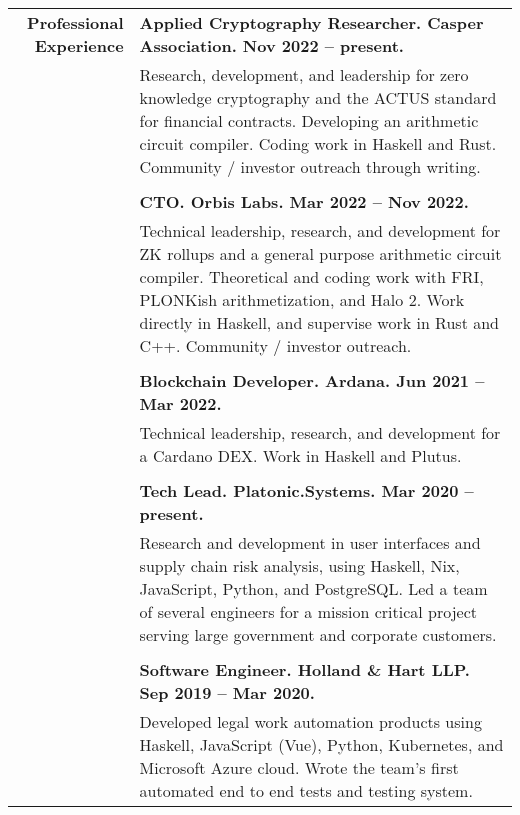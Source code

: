 \documentclass{article}
\begin{document}
\begin{tabular}{rl}
  {\bf Professional Experience} 
  & {\bf Applied Cryptography Researcher. Casper Association. Nov 2022 -- present.} \\
  & \parbox{4.5in}{Research, development, and leadership for zero knowledge cryptography
	and the ACTUS standard for financial contracts. Developing an arithmetic circuit compiler.
	Coding work in Haskell and Rust. Community / investor outreach through writing.} \\ \\
  & {\bf CTO. Orbis Labs. Mar 2022 -- Nov 2022.} \\
  & \parbox{4.5in}{Technical leadership, research, and development for ZK rollups and a general purpose arithmetic circuit compiler. Theoretical and coding work with FRI, PLONKish arithmetization, and Halo 2. Work directly in Haskell, and supervise work in Rust and C++. Community / investor outreach.} \\ \\
  & {\bf Blockchain Developer. Ardana. Jun 2021 -- Mar 2022.} \\
  & \parbox{4.5in}{Technical leadership, research, and development for a Cardano DEX. Work in Haskell and Plutus.} \\ \\
  & {\bf Tech Lead. Platonic.Systems. Mar 2020 -- present.}\\
  & \parbox{4.5in}{Research and development in user interfaces and supply chain risk analysis, using Haskell, Nix, JavaScript, Python, and PostgreSQL. Led a team of several engineers for a mission critical project serving large government and corporate customers.} \\ \\
  & {\bf Software Engineer. Holland \& Hart LLP. Sep 2019 -- Mar 2020.} \\
  & \parbox{4.5in}{Developed legal work automation products using Haskell, JavaScript (Vue), Python, Kubernetes, and Microsoft Azure cloud. Wrote the team's first automated end to end tests and testing system.}
\end{tabular}
\end{document}
